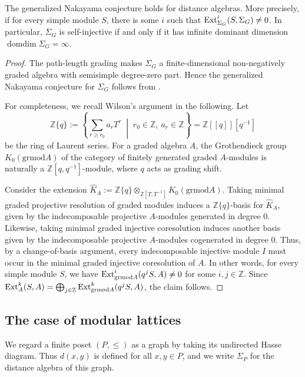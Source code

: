 \documentclass[a4paper,leqno]{amsart}
\begin{document}
\begin{prop}
The generalized Nakayama conjecture holds for distance algebras. More
precisely, if
for every simple module $S$, there is some $i$ such that $\operatorname{Ext}_{\Sigma_G}^i(S,\Sigma_G)\neq 0$.
In particular, $\Sigma_G$ is self-injective if and only if it has infinite dominant dimension $\operatorname{domdim}\Sigma_G=\infty$.
\end{prop}

\begin{proof}
The path-length grading makes $\Sigma_G$ a finite-dimensional
non-negatively graded algebra with semisimple degree-zero part. 
Hence the generalized Nakayama conjecture for $\Sigma_G$ follows from \cite[Section~2]{Wil83}.

For completeness, we recall Wilson's argument in the following.
Let
$$\mathbb Z\{q\}:=\left\{
\sum_{r\geq r_0}a_rT^r
\;\middle|\;
r_0\in\mathbb Z,\ a_r\in\mathbb Z
\right\}=\mathbb Z[[q]][q^{-1}]$$
be the ring of Laurent series.
For a graded algebra $A$, the Grothendieck group $K_0(\mathrm{grmod} A)$ of the category of finitely generated graded $A$-modules is naturally a $\mathbb{Z}[q,q^{-1}]$-module, where $q$ acts as grading shift.

Consider the extension $\widehat{K}_A := \mathbb{Z}\{q\}\otimes_{\mathbb{Z}[T,T^{-1}]} K_0(\mathrm{grmod} A)$. Taking minimal graded projective resolution of graded modules induces a $\mathbb{Z}\{q\}$-basis for $\widehat{K}_A$, given by the indecomposable projective $A$-modules generated in degree $0$.
Likewise, taking minimal graded injective coresolution induces another basis given by the indecomposable projective $A$-modules cogenerated in degree $0$.
Thus, by a change-of-basis argument, every indecomposable injective module $I$ must occur in the minimal graded injective coresolution of $A$.  In other words, for every simple module $S$, we have $\operatorname{Ext}_{\mathrm{grmod}A}^i(q^jS,A)\neq 0$ for some $i,j\in \mathbb{Z}$.  Since $\operatorname{Ext}_A^k(S,A) = \bigoplus_{j\in\mathbb{Z}} \operatorname{Ext}_{\mathrm{grmod} A}^k(q^jS,A)$, the claim follows.   
\end{proof}


\subsection{The case of modular lattices}\label{subsec:modular-lattice}

We regard a finite poset $(P,\leq)$ as a graph by taking its undirected Hasse diagram. Thus $d(x,y)$ is defined for all $x,y\in P$, and we write $\Sigma_P$ for the distance algebra of this graph.
\end{document}
